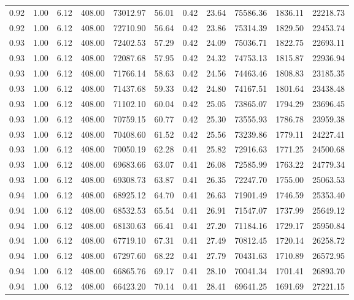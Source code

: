 \begin{table}[!ht]
\begin{tabular}{rrrrrrrrrrr}
0.92 & 1.00 & 6.12 & 408.00 & 73012.97 & 56.01 & 0.42 & 23.64 & 75586.36 & 1836.11 & 22218.73 \\
0.92 & 1.00 & 6.12 & 408.00 & 72710.90 & 56.64 & 0.42 & 23.86 & 75314.39 & 1829.50 & 22453.74 \\
0.93 & 1.00 & 6.12 & 408.00 & 72402.53 & 57.29 & 0.42 & 24.09 & 75036.71 & 1822.75 & 22693.11 \\
0.93 & 1.00 & 6.12 & 408.00 & 72087.68 & 57.95 & 0.42 & 24.32 & 74753.13 & 1815.87 & 22936.94 \\
0.93 & 1.00 & 6.12 & 408.00 & 71766.14 & 58.63 & 0.42 & 24.56 & 74463.46 & 1808.83 & 23185.35 \\
0.93 & 1.00 & 6.12 & 408.00 & 71437.68 & 59.33 & 0.42 & 24.80 & 74167.51 & 1801.64 & 23438.48 \\
0.93 & 1.00 & 6.12 & 408.00 & 71102.10 & 60.04 & 0.42 & 25.05 & 73865.07 & 1794.29 & 23696.45 \\
0.93 & 1.00 & 6.12 & 408.00 & 70759.15 & 60.77 & 0.42 & 25.30 & 73555.93 & 1786.78 & 23959.38 \\
0.93 & 1.00 & 6.12 & 408.00 & 70408.60 & 61.52 & 0.42 & 25.56 & 73239.86 & 1779.11 & 24227.41 \\
0.93 & 1.00 & 6.12 & 408.00 & 70050.19 & 62.28 & 0.41 & 25.82 & 72916.63 & 1771.25 & 24500.68 \\
0.93 & 1.00 & 6.12 & 408.00 & 69683.66 & 63.07 & 0.41 & 26.08 & 72585.99 & 1763.22 & 24779.34 \\
0.93 & 1.00 & 6.12 & 408.00 & 69308.73 & 63.87 & 0.41 & 26.35 & 72247.70 & 1755.00 & 25063.53 \\
0.94 & 1.00 & 6.12 & 408.00 & 68925.12 & 64.70 & 0.41 & 26.63 & 71901.49 & 1746.59 & 25353.40 \\
0.94 & 1.00 & 6.12 & 408.00 & 68532.53 & 65.54 & 0.41 & 26.91 & 71547.07 & 1737.99 & 25649.12 \\
0.94 & 1.00 & 6.12 & 408.00 & 68130.63 & 66.41 & 0.41 & 27.20 & 71184.16 & 1729.17 & 25950.84 \\
0.94 & 1.00 & 6.12 & 408.00 & 67719.10 & 67.31 & 0.41 & 27.49 & 70812.45 & 1720.14 & 26258.72 \\
0.94 & 1.00 & 6.12 & 408.00 & 67297.60 & 68.22 & 0.41 & 27.79 & 70431.63 & 1710.89 & 26572.95 \\
0.94 & 1.00 & 6.12 & 408.00 & 66865.76 & 69.17 & 0.41 & 28.10 & 70041.34 & 1701.41 & 26893.70 \\
0.94 & 1.00 & 6.12 & 408.00 & 66423.20 & 70.14 & 0.41 & 28.41 & 69641.25 & 1691.69 & 27221.15 \\

\end{tabular}
\end{table}
